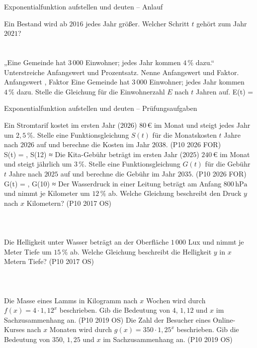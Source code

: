 \begin{aufgabe}{Exponentialfunktion aufstellen und deuten – Anlauf}
\begin{teile}
\teil Ein Bestand wird ab $2016$ jedes Jahr größer. Welcher Schritt $t$ gehört zum Jahr $2021$? \\  \\  \\ 
\teil „Eine Gemeinde hat $3\,000$ Einwohner; jedes Jahr kommen $4\,\%$ dazu.“ Unterstreiche Anfangswert und Prozentsatz. Nenne Anfangswert und Faktor. Anfangswert \leerfeld , Faktor \leerfeld
\teil Eine Gemeinde hat $3\,000$ Einwohner; jedes Jahr kommen $4\,\%$ dazu. Stelle die Gleichung für die Einwohnerzahl $E$ nach $t$ Jahren auf. E(t) = \leerfeld
\end{teile}
\end{aufgabe}

\begin{aufgabe}{Exponentialfunktion aufstellen und deuten – Prüfungsaufgaben}
\begin{teile}
\teil Ein Stromtarif kostet im ersten Jahr ($2026$) $80\,€$ im Monat und steigt jedes Jahr um $2{,}5\,\%$. Stelle eine Funktionsgleichung $S(t)$ für die Monatskosten $t$ Jahre nach $2026$ auf und berechne die Kosten im Jahr $2038$. \hfill (P10 2026 FOR) \\ S(t) = \leerfeld , S(12) ≈ \leerfeld[€]
\teil Die Kita-Gebühr beträgt im ersten Jahr ($2025$) $240\,€$ im Monat und steigt jährlich um $3\,\%$. Stelle eine Funktionsgleichung $G(t)$ für die Gebühr $t$ Jahre nach $2025$ auf und berechne die Gebühr im Jahr $2035$. \hfill (P10 2026 FOR) \\ G(t) = \leerfeld , G(10) ≈ \leerfeld[€]
\steil Der Wasserdruck in einer Leitung beträgt am Anfang $800\,\mathrm{hPa}$ und nimmt je Kilometer um $12\,\%$ ab. Welche Gleichung beschreibt den Druck $y$ nach $x$ Kilometern? \hfill (P10 2017 OS) \\  \\  \\  \\ 
\steil Die Helligkeit unter Wasser beträgt an der Oberfläche $1\,000$ Lux und nimmt je Meter Tiefe um $15\,\%$ ab. Welche Gleichung beschreibt die Helligkeit $y$ in $x$ Metern Tiefe? \hfill (P10 2017 OS) \\  \\  \\  \\ 
\steil Die Masse eines Lamms in Kilogramm nach $x$ Wochen wird durch $f(x) = 4 \cdot 1{,}12^x$ beschrieben. Gib die Bedeutung von $4$, $1{,}12$ und $x$ im Sachzusammenhang an. \hfill (P10 2019 OS)
\steil Die Zahl der Besucher eines Online-Kurses nach $x$ Monaten wird durch $g(x) = 350 \cdot 1{,}25^x$ beschrieben. Gib die Bedeutung von $350$, $1{,}25$ und $x$ im Sachzusammenhang an. \hfill (P10 2019 OS)
\end{teile}
\end{aufgabe}

